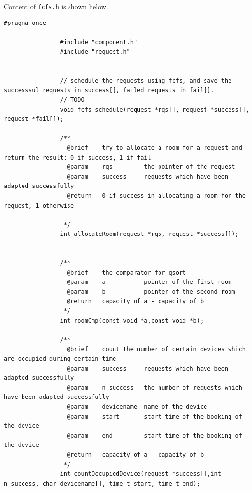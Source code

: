 \documentclass{article}
\begin{document}
            \paragraph{}
                Content of \texttt{fcfs.h} is shown below.
            \begin{Verbatim}[gobble=8]
                #pragma once

                #include "component.h"
                #include "request.h"
                
                
                // schedule the requests using fcfs, and save the successsul requests in success[], failed requests in fail[].
                // TODO
                void fcfs_schedule(request *rqs[], request *success[], request *fail[]);
                
                /**
                  @brief    try to allocate a room for a request and return the result: 0 if success, 1 if fail
                  @param    rqs         the pointer of the request
                  @param    success     requests which have been adapted successfully
                  @return   0 if success in allocating a room for the request, 1 otherwise
                
                 */
                int allocateRoom(request *rqs, request *success[]);
                
                
                /**
                  @brief    the comparator for qsort
                  @param    a           pointer of the first room
                  @param    b           pointer of the second room
                  @return   capacity of a - capacity of b
                 */
                int roomCmp(const void *a,const void *b);
                
                /**
                  @brief    count the number of certain devices which are occupied during certain time
                  @param    success     requests which have been adapted successfully
                  @param    n_success   the number of requests which have been adapted successfully
                  @param    devicename  name of the device
                  @param    start       start time of the booking of the device
                  @param    end         start time of the booking of the device
                  @return   capacity of a - capacity of b
                 */
                int countOccupiedDevice(request *success[],int n_success, char devicename[], time_t start, time_t end);
            \end{Verbatim}
\end{document}
